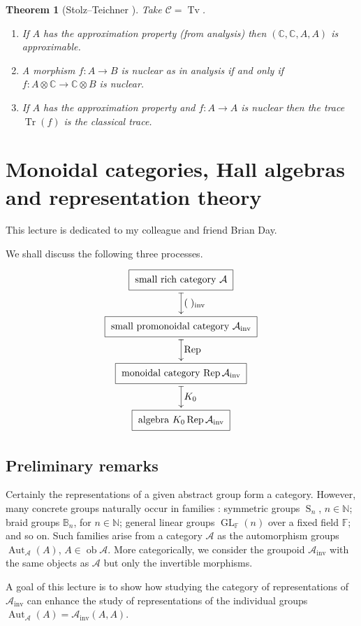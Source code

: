 \documentclass[a4paper,12pt]{article}
\newtheorem*{Theorem}{Theorem}%
\theoremstyle{definition}
\theoremstyle{fact}
\theoremstyle{genquest}
\theoremstyle{step}
\newcommand{\catA}{\mathcal{A}}
\newcommand{\Aut}{\operatorname{Aut}}
\newcommand{\BB}{\mathbb{B}}
\newcommand{\catC}{\mathcal{C}}
\newcommand{\CC}{\mathbb{C}}
\newcommand{\FF}{\mathbb{F}}
\newcommand{\GL}{\operatorname{GL}}
\newcommand{\NN}{\mathbb{N}}
\newcommand{\Rep}{\operatorname{Rep}}
\newcommand{\LieS}{\operatorname{S}\nolimits}
\newcommand{\Tr}{\operatorname{Tr}}
\newcommand{\Tv}{\operatorname{Tv}}
\newcommand{\inv}{\mathrm{inv}}
\newcommand{\ob}{\operatorname{ob}}
\newcommand{\longto}{\longrightarrow}
\begin{document}
\begin{Theorem} [Stolz--Teichner \cite{StolzTeichner}] 
Take $\catC = \Tv$.
%
\begin{enumerate}[\upshape 1.]
\item
 If $A$ has the approximation property (from analysis) then $( \CC,  \CC, A, A)$ is approximable.
\item
 A morphism $f:A\longto B$ is nuclear as in analysis if and only if $f:A \otimes \CC \to \CC \otimes B$ is nuclear.
\item
 If $A$ has the approximation property and $f:A\to A$ is nuclear then the trace $\Tr(f)$ is the classical trace.
\end{enumerate}
\end{Theorem}


\section{Monoidal categories, Hall algebras and representation theory\label{Lecture2}}

This lecture is dedicated to my colleague and friend Brian Day.

\noindent
We shall discuss the following three processes.
\[
\xygraph{ !{\UseTips{}}!{/u4pc/::}
 []*++[F-]+!C\txt{small rich category $\catA$}
  :@{|->}^{\objectstyle(\;)_{\mathrm{inv}}}
 [d]*++[F-]+!C\txt{small promonoidal category $\catA_{\inv}$}
  :@{|->}^{\objectstyle\Rep}
 [d]*++[F-]+!C\txt{monoidal category $\Rep\catA_{\inv}$}
  :@{|->}^{\objectstyle K_0}
 [d]*++[F-]+!C\txt{algebra $K_0\Rep\catA_{\inv}$}
}\]

\subsection{Preliminary remarks}

Certainly the representations of a given abstract group form a category.  
However, many concrete groups naturally occur in families : symmetric groups $\LieS_n$, $n \in \NN$; 
braid groups $\BB_n$,  for $n \in \NN$; general linear groups $\GL_{\FF}(n)$ over a fixed field $\FF$; and so on.  
Such families arise from a category $\catA$ as the automorphism groups $\Aut_{\catA}(A)$, $A \in \ob \catA$.  
More categorically, we consider the groupoid $\catA_{\inv}$ with the same objects as $\catA$ but only the invertible morphisms.

A goal of this lecture is to show how studying the category of representations of $\catA_{\inv}$ can enhance the study of representations of the individual groups $\Aut_{\catA}(A) = \catA_{\inv}(A,A)$.
\end{document}
